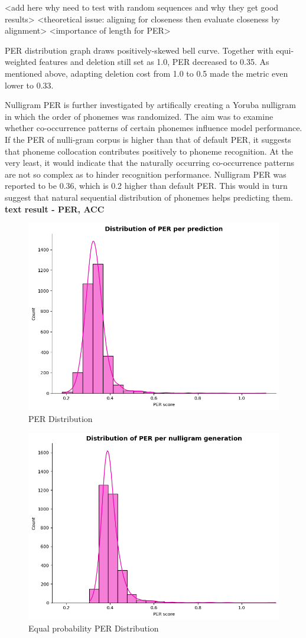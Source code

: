 \documentclass[11pt]{article}
\begin{document}
{<add here why need to test with random sequences and why they get good results>
<theoretical issue: aligning for closeness then evaluate closeness by alignment>
<importance of length for PER>

 PER distribution graph draws positively-skewed bell curve. Together with equi-weighted features and deletion still set as 1.0, PER decreased to 0.35. As mentioned above, adapting deletion cost from 1.0 to 0.5 made the metric even lower to 0.33.

Nulligram PER is further investigated by artifically creating a Yoruba nulligram in which the order of phonemes was randomized. The aim was to examine whether co-occurrence patterns of certain phonemes influence model performance. If the PER of nulli-gram corpus is higher than that of default PER, it suggests that phoneme collocation contributes positively to phoneme recognition. At the very least, it would indicate that the naturally occurring co-occurrence patterns are not so complex as to hinder recognition performance.
Nulligram PER was reported to be 0.36, which is 0.2 higher than default PER. This would in turn suggest that natural sequential distribution of phonemes helps predicting them.
\textbf{text result - PER, ACC}
\begin{figure}
    \centering
    \includegraphics[width=0.75\linewidth]{model_per_distribution.png}
    \caption{PER Distribution}
    \label{fig:placeholder}
\end{figure}

\begin{figure}
    \centering
    \includegraphics[width=0.75\linewidth]{nulligram_PER_distribution.png}
    \caption{Equal probability PER Distribution}
    \label{fig:placeholder}
\end{figure}

}
\end{document}
